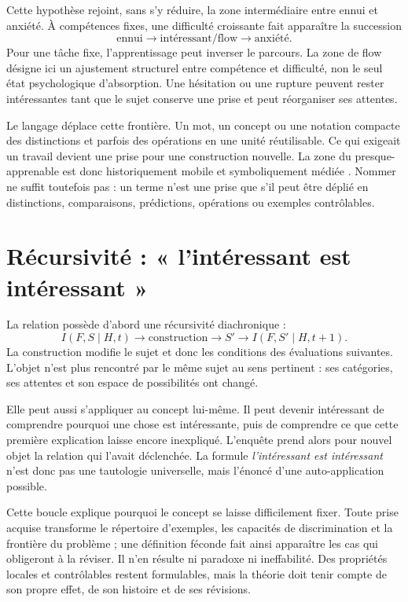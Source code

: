 \documentclass[11pt,a4paper]{article}
\begin{document}
Cette hypothèse rejoint, sans s'y réduire, la zone intermédiaire entre ennui et
anxiété. À compétences fixes, une difficulté croissante fait apparaître la
succession
\[
  \text{ennui}\longrightarrow\text{intéressant/flow}
  \longrightarrow\text{anxiété}.
\]
Pour une tâche fixe, l'apprentissage peut inverser le parcours. La zone de flow
désigne ici un ajustement structurel entre compétence et difficulté, non le seul
état psychologique d'absorption. Une hésitation ou une rupture peuvent rester
intéressantes tant que le sujet conserve une prise et peut réorganiser ses
attentes.

Le langage déplace cette frontière. Un mot, un concept ou une notation compacte
des distinctions et parfois des opérations en une unité réutilisable. Ce qui
exigeait un travail devient une prise pour une construction nouvelle. La zone
du presque-apprenable est donc historiquement mobile et symboliquement médiée
\parencite{vygotsky1978mind,lenat1991thresholds,lenat2008turtle,koestler1989act,steels2005coordinating,steels2015talkingheads}.
Nommer ne suffit toutefois pas : un terme n'est une prise que s'il peut être
déplié en distinctions, comparaisons, prédictions, opérations ou exemples
contrôlables.

\section{Récursivité : « l'intéressant est intéressant »}

La relation possède d'abord une récursivité diachronique :
\[
  I(F,S\mid H,t)\longrightarrow
  \text{construction}\longrightarrow S'
  \longrightarrow I(F,S'\mid H,t+1).
\]
La construction modifie le sujet et donc les conditions des évaluations
suivantes. L'objet n'est plus rencontré par le même sujet au sens pertinent :
ses catégories, ses attentes et son espace de possibilités ont changé.

Elle peut aussi s'appliquer au concept lui-même. Il peut devenir intéressant
de comprendre pourquoi une chose est intéressante, puis de comprendre ce que
cette première explication laisse encore inexpliqué. L'enquête prend alors pour
nouvel objet la relation qui l'avait déclenchée. La formule
\emph{l'intéressant est intéressant} n'est donc pas une tautologie universelle,
mais l'énoncé d'une auto-application possible.

Cette boucle explique pourquoi le concept se laisse difficilement fixer. Toute prise
acquise transforme le répertoire d'exemples, les capacités de discrimination et
la frontière du problème ; une définition féconde fait ainsi apparaître les cas
qui obligeront à la réviser. Il n'en résulte ni paradoxe ni ineffabilité. Des
propriétés locales et contrôlables restent formulables, mais la théorie doit
tenir compte de son propre effet, de son histoire et de ses révisions.
\end{document}
